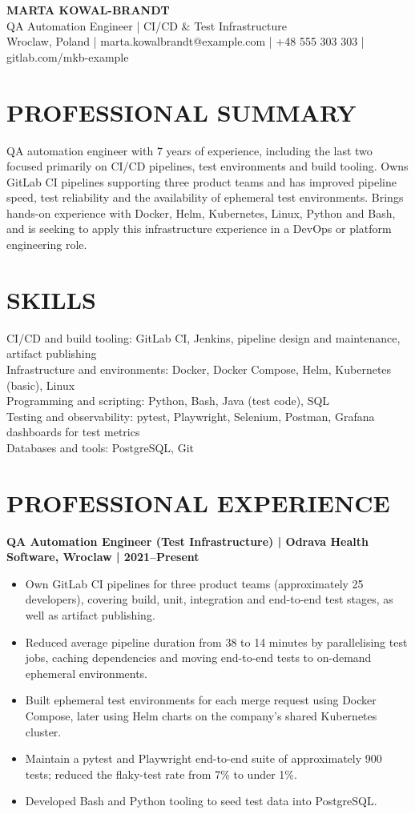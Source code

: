 \documentclass[11pt,a4paper]{article}
\begin{document}
\begin{center}
{\Huge\bfseries\color{primarycolor} MARTA KOWAL-BRANDT}\\[0.3em]
{\large QA Automation Engineer | CI/CD \& Test Infrastructure}\\[0.25em]
Wroclaw, Poland | marta.kowalbrandt@example.com | +48 555 303 303 | gitlab.com/mkb-example
\end{center}

\section*{PROFESSIONAL SUMMARY}
QA automation engineer with 7 years of experience, including the last two focused primarily on CI/CD pipelines, test environments and build tooling. Owns GitLab CI pipelines supporting three product teams and has improved pipeline speed, test reliability and the availability of ephemeral test environments. Brings hands-on experience with Docker, Helm, Kubernetes, Linux, Python and Bash, and is seeking to apply this infrastructure experience in a DevOps or platform engineering role.

\section*{SKILLS}
CI/CD and build tooling: GitLab CI, Jenkins, pipeline design and maintenance, artifact publishing\\
Infrastructure and environments: Docker, Docker Compose, Helm, Kubernetes (basic), Linux\\
Programming and scripting: Python, Bash, Java (test code), SQL\\
Testing and observability: pytest, Playwright, Selenium, Postman, Grafana dashboards for test metrics\\
Databases and tools: PostgreSQL, Git

\section*{PROFESSIONAL EXPERIENCE}
\textbf{QA Automation Engineer (Test Infrastructure) | Odrava Health Software, Wroclaw | 2021--Present}
\begin{itemize}
\item Own GitLab CI pipelines for three product teams (approximately 25 developers), covering build, unit, integration and end-to-end test stages, as well as artifact publishing.
\item Reduced average pipeline duration from 38 to 14 minutes by parallelising test jobs, caching dependencies and moving end-to-end tests to on-demand ephemeral environments.
\item Built ephemeral test environments for each merge request using Docker Compose, later using Helm charts on the company’s shared Kubernetes cluster.
\item Maintain a pytest and Playwright end-to-end suite of approximately 900 tests; reduced the flaky-test rate from 7\% to under 1\%.
\item Developed Bash and Python tooling to seed test data into PostgreSQL.
\end{itemize}
\end{document}
